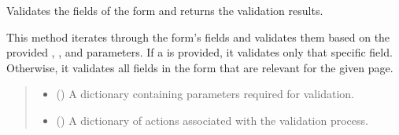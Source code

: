 \documentclass[letterpaper,10pt,english]{sphinxmanual}
\begin{document}
\begin{fulllineitems}
\begin{fulllineitems}
\begin{quote}
\begin{description}
\end{description}\end{quote}

\end{fulllineitems}


\begin{fulllineitems}
\label{\detokenize{apache_commons_validator_python:apache_commons_validator_python.form_new.Form.validate}}
\pysigstartsignatures
{}
\pysigstopsignatures
\sphinxAtStartPar
Validates the fields of the form and returns the validation results.

\sphinxAtStartPar
This method iterates through the form’s fields and validates them based on the provided
, , and  parameters. If a  is provided, it validates
only that specific field. Otherwise, it validates all fields in the form that are
relevant for the given page.
\begin{quote}\begin{description}
\begin{itemize}
\item {} 
\sphinxAtStartPar
{} () \textendash{} A dictionary containing parameters required for validation.

\item {} 
\sphinxAtStartPar
{} () \textendash{} A dictionary of actions associated with the validation process.


\end{itemize}
\end{description}
\end{quote}
\end{fulllineitems}
\end{fulllineitems}
\end{document}
